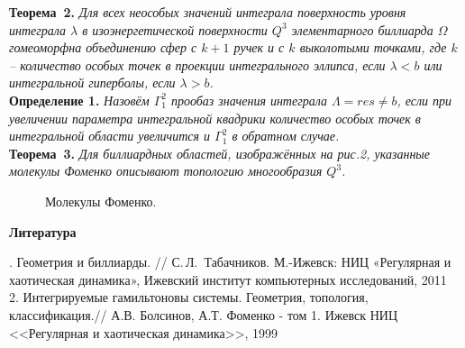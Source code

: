 \textbf{Теорема~2.} {\it Для всех неособых значений интеграла повер\-хность уровня интеграла $\lambda$
	в изоэнергетичес\-кой поверхности $Q^3$ элементарного биллиарда $\Omega$ гомеоморфна объединению сфер с $k+1$ ручек и с $k$ выколотыми точками, где $k$ -- количество особых точек в проекции интегрального эллипса, если $\lambda<b$ или интегральной гиперболы, если $\lambda>b$.} \\
\textbf{Определение 1.} {\it
	Назовём $\Gamma^2_1$ прообаз значения интеграла $\varLambda = res \neq b$, если при увеличении параметра интегральной квадрики количество особых точек в интегральной области увеличится и $\Gamma^2_1$ в обратном случае. } \\
\textbf{Теорема~3.} {\it Для биллиардных областей, изображённых на рис.2, указанные молекулы Фоменко описывают топологию многообразия $Q^3$. }


\begin{figure}[h]
	\caption{Молекулы Фоменко.}
\end{figure}


\smallskip \centerline{\bf Литература}.  Геометрия и биллиарды. // С.\,Л.~Табачников. М.-Ижевск: НИЦ «Регулярная и хаотическая динамика», Ижевский институт компьютерных исследований,
2011 \\
2. Интегрируемые гамильтоновы системы. Геометрия, топология, классификация.// 	А.В. Болсинов, А.Т. Фоменко - том 1. Ижевск НИЦ	<<Регулярная и хаотическая динамика>>, 1999\\



